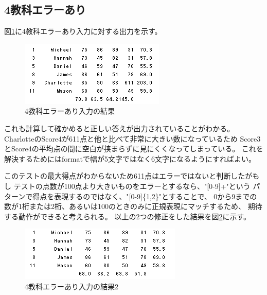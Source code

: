 \documentclass[dvipdfmx]{jsarticle}
\begin{document}
\subsection{4教科エラーあり}
図\ref{res2}に4教科エラーあり入力に対する出力を示す。
\begin{figure}[H]
  \centering
  \includegraphics[width=0.6\hsize]{../pic/res2.png}
  \caption{4教科エラーあり入力の結果}
  \label{res2}
\end{figure}

これも計算して確かめると正しい答えが出力されていることがわかる。
CharlotteのScore4が611点と他と比べて非常に大きい数になっているため
Score3とScore4の平均点の間に空白が挟まらずに見にくくなってしまっている。
これを解決するためにはformatで幅が5文字ではなく6文字になるようにすればよい。

このテストの最大得点がわからないため611点はエラーではないと判断したがもし
テストの点数が100点より大きいものをエラーとするなら、"[0-9]+"という
パターンで得点を表現するのではなく、"[0-9]\{1,2\}"とすることで、
0から9までの数が1桁または2桁、あるいは100のときのみに正規表現にマッチするため、
期待する動作ができると考えられる。
以上の2つの修正をした結果を図\ref{res2_2}に示す。
\begin{figure}[H]
  \centering
  \includegraphics[width=0.7\hsize]{../pic/res2_2.png}
  \caption{4教科エラーあり入力の結果2}
  \label{res2_2}
\end{figure}
\end{document}
